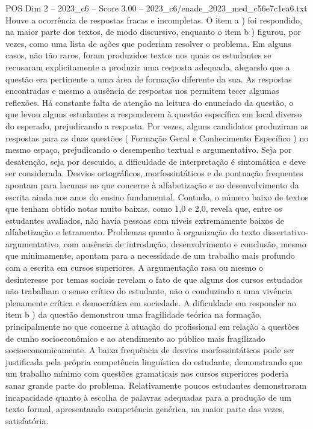 \begin{textsample}{POS Dim 2 – 2023\_c6 – Score 3.00 – 2023\_c6/enade\_2023\_med\_c56e7c1ea6.txt}
Houve a ocorrência de respostas fracas e incompletas.
O item a ) foi respondido, na maior parte dos textos, de modo discursivo, enquanto o item b ) figurou, por vezes, como uma lista de ações que poderiam resolver o problema.
Em alguns casos, não tão raros, foram produzidos textos nos quais os estudantes se recusaram explicitamente a produzir uma resposta adequada, alegando que a questão era pertinente a uma área de formação diferente da sua.
As respostas encontradas e mesmo a ausência de respostas nos permitem tecer algumas reflexões.
Há constante falta de atenção na leitura do enunciado da questão, o que levou alguns estudantes a responderem à questão específica em local diverso do esperado, prejudicando a resposta.
Por vezes, alguns candidatos produziram as respostas para as duas questões ( Formação Geral e Conhecimento Específico ) no mesmo espaço, prejudicando o desempenho textual e argumentativo.
Seja por desatenção, seja por descuido, a dificuldade de interpretação é sintomática e deve ser considerada.
Desvios ortográficos, morfossintáticos e de pontuação frequentes apontam para lacunas no que concerne à alfabetização e ao desenvolvimento da escrita ainda nos anos do ensino fundamental.
Contudo, o número baixo de textos que tenham obtido notas muito baixas, como 1,0 e 2,0, revela que, entre os estudantes avaliados, não havia pessoas com níveis extremamente baixos de alfabetização e letramento.
Problemas quanto à organização do texto dissertativo-argumentativo, com ausência de introdução, desenvolvimento e conclusão, mesmo que minimamente, apontam para a necessidade de um trabalho mais profundo com a escrita em cursos superiores.
A argumentação rasa ou mesmo o desinteresse por temas sociais revelam o fato de que alguns dos cursos estudados não trabalham o senso crítico do estudante, não o conduzindo a uma vivência plenamente crítica e democrática em sociedade.
A dificuldade em responder ao item b ) da questão demonstrou uma fragilidade teórica na formação, principalmente no que concerne à atuação do profissional em relação a questões de cunho socioeconômico e ao atendimento ao público mais fragilizado socioeconomicamente.
A baixa frequência de desvios morfossintáticos pode ser justificada pela própria competência linguística do estudante, demonstrando que um trabalho mínimo com questões gramaticais nos cursos superiores poderia sanar grande parte do problema.
Relativamente poucos estudantes demonstraram incapacidade quanto à escolha de palavras adequadas para a produção de um texto formal, apresentando competência genérica, na maior parte das vezes, satisfatória.

\end{textsample}
